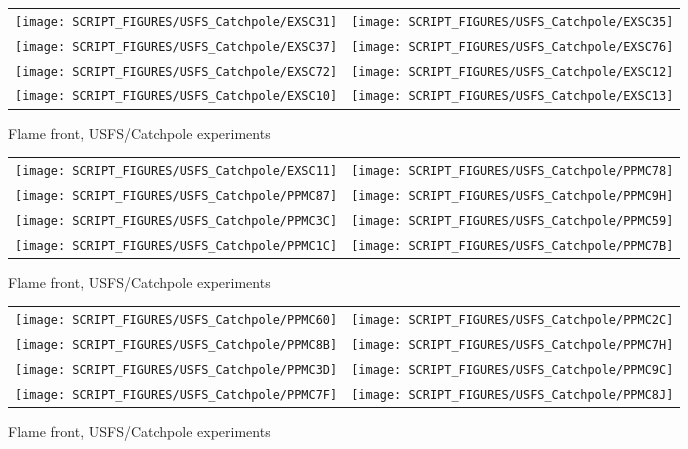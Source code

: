 \begin{figure}[p]
\begin{tabular*}{\textwidth}{l@{\extracolsep{\fill}}r}
\texttt{[image: SCRIPT\_FIGURES/USFS\_Catchpole/EXSC31]} &
\texttt{[image: SCRIPT\_FIGURES/USFS\_Catchpole/EXSC35]} \\
\texttt{[image: SCRIPT\_FIGURES/USFS\_Catchpole/EXSC37]} &
\texttt{[image: SCRIPT\_FIGURES/USFS\_Catchpole/EXSC76]} \\
\texttt{[image: SCRIPT\_FIGURES/USFS\_Catchpole/EXSC72]} &
\texttt{[image: SCRIPT\_FIGURES/USFS\_Catchpole/EXSC12]} \\
\texttt{[image: SCRIPT\_FIGURES/USFS\_Catchpole/EXSC10]} &
\texttt{[image: SCRIPT\_FIGURES/USFS\_Catchpole/EXSC13]} \\
\end{tabular*}
\caption[Flame front, USFS/Catchpole experiments]{Flame front, USFS/Catchpole experiments}
\label{USFS_Catchpole_160}
\end{figure}

\begin{figure}[p]
\begin{tabular*}{\textwidth}{l@{\extracolsep{\fill}}r}
\texttt{[image: SCRIPT\_FIGURES/USFS\_Catchpole/EXSC11]} &
\texttt{[image: SCRIPT\_FIGURES/USFS\_Catchpole/PPMC78]} \\
\texttt{[image: SCRIPT\_FIGURES/USFS\_Catchpole/PPMC87]} &
\texttt{[image: SCRIPT\_FIGURES/USFS\_Catchpole/PPMC9H]} \\
\texttt{[image: SCRIPT\_FIGURES/USFS\_Catchpole/PPMC3C]} &
\texttt{[image: SCRIPT\_FIGURES/USFS\_Catchpole/PPMC59]} \\
\texttt{[image: SCRIPT\_FIGURES/USFS\_Catchpole/PPMC1C]} &
\texttt{[image: SCRIPT\_FIGURES/USFS\_Catchpole/PPMC7B]} \\
\end{tabular*}
\caption[Flame front, USFS/Catchpole experiments]{Flame front, USFS/Catchpole experiments}
\label{USFS_Catchpole_168}
\end{figure}

\begin{figure}[p]
\begin{tabular*}{\textwidth}{l@{\extracolsep{\fill}}r}
\texttt{[image: SCRIPT\_FIGURES/USFS\_Catchpole/PPMC60]} &
\texttt{[image: SCRIPT\_FIGURES/USFS\_Catchpole/PPMC2C]} \\
\texttt{[image: SCRIPT\_FIGURES/USFS\_Catchpole/PPMC8B]} &
\texttt{[image: SCRIPT\_FIGURES/USFS\_Catchpole/PPMC7H]} \\
\texttt{[image: SCRIPT\_FIGURES/USFS\_Catchpole/PPMC3D]} &
\texttt{[image: SCRIPT\_FIGURES/USFS\_Catchpole/PPMC9C]} \\
\texttt{[image: SCRIPT\_FIGURES/USFS\_Catchpole/PPMC7F]} &
\texttt{[image: SCRIPT\_FIGURES/USFS\_Catchpole/PPMC8J]} \\
\end{tabular*}
\caption[Flame front, USFS/Catchpole experiments]{Flame front, USFS/Catchpole experiments}
\label{USFS_Catchpole_176}
\end{figure}

